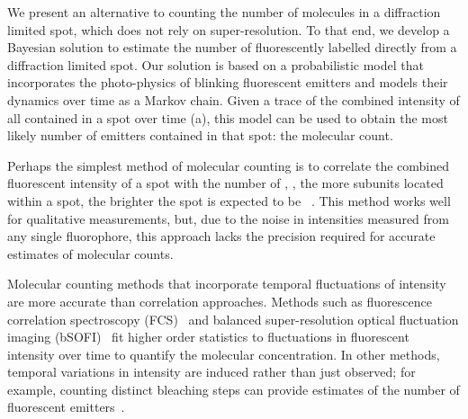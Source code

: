 %
We present an alternative to counting the number of molecules in a diffraction
limited spot, which does not rely on super-resolution.
%
  To that end, we develop a Bayesian solution to estimate the number of
  fluorescently labelled \smallobjects directly from a diffraction limited
  spot.
  Our solution is based on a probabilistic model that incorporates the
  photo-physics of blinking fluorescent emitters and models their dynamics over
  time as a Markov chain.
  Given a trace of the combined intensity of all \smallobjects contained in a
  spot over time (a), this model can be used to obtain the 
  most likely number of emitters contained in that spot: the molecular count.

%
%


%
Perhaps the simplest method of molecular counting is to correlate the combined
fluorescent intensity of a spot with the number of \smallobjects, \ie, the more subunits 
located within a spot, the brighter the spot is expected to be ~\citep{schmied_2012,
tolar_2005}.
  This method works well for qualitative measurements, but, due to the noise in
  intensities measured from any single fluorophore, this approach lacks the precision 
  required for accurate estimates of molecular counts. 

%
Molecular counting methods that incorporate temporal fluctuations of intensity
are more accurate than correlation approaches.
  Methods such as fluorescence correlation spectroscopy
  (FCS)~\citep{otsuka_2023,wachsmuth_2015,politi_2018} and balanced
  super-resolution optical fluctuation imaging
  (bSOFI)~\citep{geissbuehler_2012} fit higher order statistics to fluctuations
  in fluorescent intensity over time to quantify the molecular concentration.
  In other methods, temporal variations in intensity are induced rather than
  just observed; for example, counting distinct bleaching
  steps can provide estimates of the number of fluorescent
  emitters~\citep{ulbrich_2007,jain_2011,hummert_2021, garry_bayesian_2020}.

